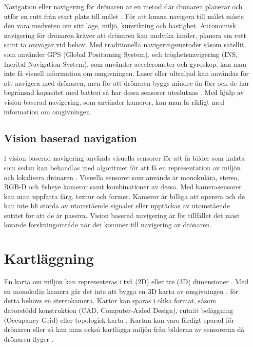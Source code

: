 Navigation eller navigering för drönaren är en metod där drönaren planerar och utför en rutt från start plats till målet \citep{geospatial}. För att kunna navigera till målet måste den vara medveten om sitt läge, miljö, kursrikting och hastighet. Autonomisk navigering för drönaren kräver att drönaren kan undvika hinder, planera sin rutt samt ta omvägar vid behov. Med traditionella navigeringsmetoder såsom satellit, som använder GPS (Global Positioning System), och tröghetsnavigering (INS, Inerital Navigation System), som använder accelerometer och gyroskop, kan man inte få visuell information om omgivningen. Laser eller ultraljud kan användas för att navigera med drönaren, men för att drönaren byggs mindre än förr och de har begränsad kapasitet med batteri så har dessa sensorer uteslutnas \citep{6385934}. Med hjälp av vision baserad navigering, som använder kameror, kan man få rikligt med information om omgivningen. 

\subsection{Vision baserad navigation}

I vision baserad navigering används visuella sensorer för att få bilder som indata som sedan kan behandlas med algoritmer för att få en representation av miljön och lokalisera drönaren \citep{geospatial}. Visuella sensorer som används är monokulära, stereo, RGB-D och fisheye kameror samt kombinationer av dessa. Med kamerasensorer kan man uppfatta färg, textur och former. Kameror är billiga att operera och de kan inte bli störda av utomstående signaler eller upptäckas av utomstående entitet för att de är passiva. Vision baserad navigering är för tillfället det mäst lovande forskningområde när det kommer till navigering av drönaren.

\section{Kartläggning}

En karta om miljön kan representeras i två (2D) eller tre (3D) dimensioner \citep{geospatial}. Med en monokulär kamera går det inte att bygga en 3D karta av omgivningen \citep{depthmap}, för detta behövs en stereokamera. Kartor kan sparas i olika format, såsom datorstödd konstruktion (CAD, Computer-Aided Design), rutnät beläggning (Occupancy Grid) eller topologisk karta \citep{982903}. Kartan kan vara färdigt sparad för drönaren eller så kan man också kartlägga miljön från bilderna av sensorerna då drönaren flyger \citep{geospatial}. 

